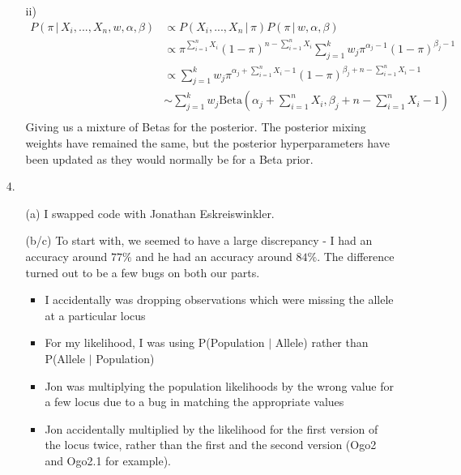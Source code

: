 \documentclass[11pt]{article}
\theoremstyle{definition}
\begin{document}
\begin{itemize}
\begin{itemize}
            \item[ii)]
                \begin{align*}
                    P(\pi \,|\, X_i,...,X_n,w,\alpha,\beta) &\propto P( X_i,...,X_n \,|\, \pi )P(\pi \,|\, w,\alpha,\beta) \\
                                                            &\propto  \pi^{\sum_{i=1}^n X_i}(1-\pi)^{n-\sum_{i=1}^n X_i} \sum_{j=1}^k w_j\pi^{\alpha_j-1}(1-\pi)^{\beta_j-1} \\
                                                            &\propto  \sum_{j=1}^k w_j\pi^{\alpha_j+\sum_{i=1}^n X_i-1}(1-\pi)^{\beta_j+n-\sum_{i=1}^n X_i-1} \\
                                                            &\sim \sum_{j=1}^k w_j \mathrm{Beta}\left(\alpha_j+\sum_{i=1}^n X_i,\beta_j+n-\sum_{i=1}^n X_i-1\right)\\
                \end{align*}
                Giving us a mixture of Betas for the posterior. The posterior mixing weights have remained the same, but the posterior hyperparameters have been updated as they would normally be for a Beta prior.
        \end{itemize}
    \item[4.]
        \begin{itemize}
            \item[(a)] I swapped code with Jonathan Eskreiswinkler.
            \item[(b/c)] To start with, we seemed to have a large discrepancy - I had an accuracy around $77\%$ and he had an accuracy around $84\%$. The difference turned out to be a few bugs on both our parts. \\
                \begin{itemize}
                    \item I accidentally was dropping observations which were missing the allele at a particular locus \\
                    \item For my likelihood, I was using P(Population $|$ Allele) rather than P(Allele $|$ Population) \\
                    \item Jon was multiplying the population likelihoods by the wrong value for a few locus due to a bug in matching the appropriate values \\
                    \item Jon accidentally multiplied by the likelihood for the first version of the locus twice, rather than the first and the second version (Ogo2 and Ogo2.1 for example).

\end{itemize}
\end{itemize}
\end{itemize}
\end{document}
